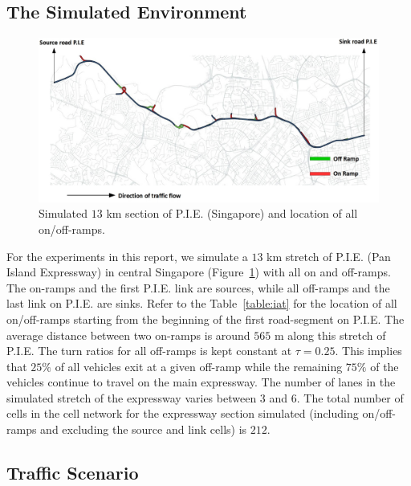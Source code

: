 \documentclass[conference]{IEEEtran}
\begin{document}
\subsection{The Simulated Environment}
\label{subsec:pie}
\begin{center}
	\begin{figure}[!htbp]
		\centering
		\includegraphics[scale=0.28]{images/PIE.jpg}
		\captionsetup{justification=centering}
		\caption{Simulated $13$ km section of P.I.E. (Singapore) and location of all on/off-ramps.}
		\label{fig:pie-changi}
	\end{figure}
\end{center}

For the experiments in this report, we simulate a $13$ km stretch of P.I.E. (Pan Island Expressway) in central Singapore (Figure~\ref{fig:pie-changi}) with all on and off-ramps. The on-ramps and the first P.I.E. link are sources, while all off-ramps and the last link on P.I.E. are sinks. Refer to the Table~\ref{table:iat} for the location of all on/off-ramps starting from the beginning of the first road-segment on P.I.E. The average distance between two on-ramps is around $565\text{~m}$ along this stretch of P.I.E. The turn ratios for all off-ramps is kept constant at $\tau=0.25$. This implies that $25\%$ of all vehicles exit at a given off-ramp while the remaining $75\%$ of the vehicles continue to travel on the main expressway. The number of lanes in the simulated stretch of the expressway varies between $3$ and $6$. The total number of cells  in the cell network for the expressway section simulated (including on/off-ramps and excluding the source and link cells) is $212$.

\subsection{Traffic Scenario}
\end{document}
